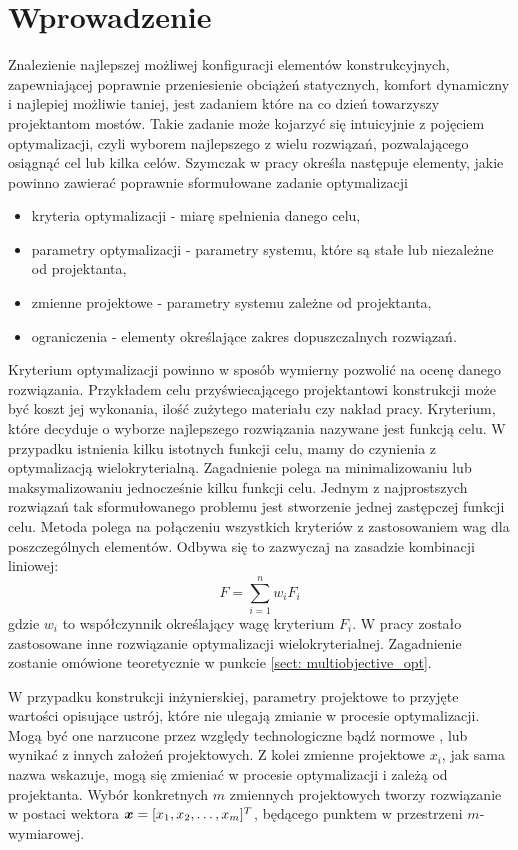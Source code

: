 \section*{Wprowadzenie}
Znalezienie najlepszej możliwej konfiguracji elementów konstrukcyjnych, zapewniającej poprawnie przeniesienie obciążeń statycznych, komfort dynamiczny i najlepiej możliwie taniej, jest zadaniem które na co dzień towarzyszy projektantom mostów. Takie zadanie może kojarzyć się intuicyjnie z pojęciem optymalizacji, czyli wyborem najlepszego z wielu rozwiązań, pozwalającego osiągnąć cel lub kilka celów. Szymczak w pracy \cite{Szymczak1995} określa następuje elementy, jakie powinno zawierać poprawnie sformułowane zadanie optymalizacji
\begin{itemize}
	\item kryteria optymalizacji - miarę spełnienia danego celu,
	\item parametry optymalizacji - parametry systemu, które są stałe lub niezależne od projektanta, 
	\item zmienne projektowe - parametry systemu zależne od projektanta,
	\item ograniczenia - elementy określające zakres dopuszczalnych rozwiązań. 
\end{itemize}
Kryterium optymalizacji powinno w sposób wymierny pozwolić na ocenę danego rozwiązania. Przykładem celu przyświecającego projektantowi konstrukcji może być koszt jej wykonania, ilość zużytego materiału czy nakład pracy. Kryterium, które decyduje o wyborze najlepszego rozwiązania nazywane jest funkcją celu. W przypadku istnienia kilku istotnych funkcji celu, mamy do czynienia z optymalizacją wielokryterialną. Zagadnienie polega na minimalizowaniu lub maksymalizowaniu jednocześnie kilku funkcji celu. Jednym z najprostszych rozwiązań tak sformułowanego problemu jest stworzenie jednej zastępczej funkcji celu. Metoda polega na połączeniu wszystkich kryteriów z zastosowaniem wag dla poszczególnych elementów. Odbywa się to zazwyczaj na zasadzie kombinacji liniowej:
\begin{equation}
	F=\sum_{i=1}^{n}w_i F_i
\end{equation}
gdzie $w_i$ to współczynnik określający wagę kryterium $F_i$. W pracy zostało zastosowane inne rozwiązanie optymalizacji wielokryterialnej. Zagadnienie zostanie omówione teoretycznie w punkcie \ref{sect: multiobjective_opt}. 

W przypadku konstrukcji inżynierskiej, parametry projektowe to przyjęte wartości opisujące ustrój, które nie ulegają zmianie w procesie optymalizacji.  Mogą być one narzucone przez względy technologiczne bądź normowe \parencite{Szymczak1995}, lub wynikać z innych założeń projektowych. Z kolei zmienne projektowe $x_i$, jak sama nazwa wskazuje, mogą się zmieniać w procesie optymalizacji i zależą od projektanta. Wybór konkretnych $m$ zmiennych projektowych tworzy rozwiązanie w postaci wektora $\bm{x}=[x_1,x_2,\dots,x_m]^T$, będącego punktem w przestrzeni $m$-wymiarowej.

